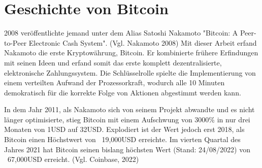 \section{Geschichte von Bitcoin}
2008 veröffentlichte jemand unter dem Alias Satoshi Nakamoto "Bitcoin: A Peer-to-Peer Electronic Cash System". (Vgl. Nakamoto 2008) 
Mit dieser Arbeit erfand Nakamoto die erste Kryptowährung, Bitcoin. Er kombinierte frühere Erfindungen mit seinen Ideen und 
erfand somit das erste komplett dezentralisierte, elektronische Zahlungssystem. Die Schlüsselrolle spielte die Implementierung 
von einem verteilten Aufwand der Prozessorkraft, wodurch alle 10 Minuten demokratisch für die korrekte Folge von Aktionen 
abgestimmt werden kann.

In dem Jahr 2011, als Nakamoto sich von seinem Projekt abwandte und es nicht länger optimisierte, stieg Bitcoin mit einem
Aufschwung von 3000\% in nur drei Monaten von 1USD auf 32USD. Explodiert ist der Wert jedoch erst 2018, als Bitcoin einen
Höchstwert von ~19,000USD erreichte. Im vierten Quartal des Jahres 2021 hat Bitcoin seinen bislang höchsten Wert (Stand: 24/08/2022)
von ~67,000USD erreicht. (Vgl. Coinbase, 2022)